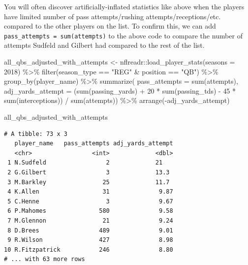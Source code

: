 \documentclass[
  letterpaper,
]{krantz}
\newenvironment{Shaded}{\begin{snugshade}}{\end{snugshade}}
\newcommand{\AttributeTok}[1]{\textcolor[rgb]{0.40,0.45,0.13}{#1}}
\newcommand{\DecValTok}[1]{\textcolor[rgb]{0.68,0.00,0.00}{#1}}
\newcommand{\FunctionTok}[1]{\textcolor[rgb]{0.28,0.35,0.67}{#1}}
\newcommand{\NormalTok}[1]{\textcolor[rgb]{0.00,0.23,0.31}{#1}}
\newcommand{\OtherTok}[1]{\textcolor[rgb]{0.00,0.23,0.31}{#1}}
\newcommand{\SpecialCharTok}[1]{\textcolor[rgb]{0.37,0.37,0.37}{#1}}
\newcommand{\StringTok}[1]{\textcolor[rgb]{0.13,0.47,0.30}{#1}}
\begin{document}
\begin{tcolorbox}[enhanced jigsaw, colback=white, leftrule=.75mm, breakable, colframe=quarto-callout-important-color-frame, bottomtitle=1mm, rightrule=.15mm, left=2mm, opacityback=0, bottomrule=.15mm, arc=.35mm, coltitle=black, colbacktitle=quarto-callout-important-color!10!white, toptitle=1mm, titlerule=0mm, title=\textcolor{quarto-callout-important-color}{\faExclamation}\hspace{0.5em}{Important}, toprule=.15mm, opacitybacktitle=0.6]

You will often discover artificially-inflated statistics like above when
the players have limited number of pass attempts/rushing
attempts/receptions/etc. compared to the other players on the list. To
confirm this, we can add \texttt{pass\_attempts\ =\ sum(attempts)} to
the above code to compare the number of attempts Sudfeld and Gilbert had
compared to the rest of the list.

\begin{Shaded}
\begin{Highlighting}[]
\NormalTok{all\_qbs\_adjusted\_with\_attempts }\OtherTok{\textless{}{-}}
\NormalTok{  nflreadr}\SpecialCharTok{::}\FunctionTok{load\_player\_stats}\NormalTok{(}\AttributeTok{seasons =} \DecValTok{2018}\NormalTok{) }\SpecialCharTok{\%\textgreater{}\%}
  \FunctionTok{filter}\NormalTok{(season\_type }\SpecialCharTok{==} \StringTok{"REG"} \SpecialCharTok{\&}\NormalTok{ position }\SpecialCharTok{==} \StringTok{"QB"}\NormalTok{) }\SpecialCharTok{\%\textgreater{}\%}
  \FunctionTok{group\_by}\NormalTok{(player\_name) }\SpecialCharTok{\%\textgreater{}\%}
  \FunctionTok{summarize}\NormalTok{(}
    \AttributeTok{pass\_attempts =} \FunctionTok{sum}\NormalTok{(attempts),}
    \AttributeTok{adj\_yards\_attempt =}\NormalTok{ (}\FunctionTok{sum}\NormalTok{(passing\_yards) }\SpecialCharTok{+} \DecValTok{20} \SpecialCharTok{*}
                           \FunctionTok{sum}\NormalTok{(passing\_tds) }\SpecialCharTok{{-}} \DecValTok{45} \SpecialCharTok{*}
                           \FunctionTok{sum}\NormalTok{(interceptions)) }\SpecialCharTok{/} \FunctionTok{sum}\NormalTok{(attempts)) }\SpecialCharTok{\%\textgreater{}\%}
  \FunctionTok{arrange}\NormalTok{(}\SpecialCharTok{{-}}\NormalTok{adj\_yards\_attempt)}

\NormalTok{all\_qbs\_adjusted\_with\_attempts}
\end{Highlighting}
\end{Shaded}

\begin{verbatim}
# A tibble: 73 x 3
   player_name   pass_attempts adj_yards_attempt
   <chr>                 <int>             <dbl>
 1 N.Sudfeld                 2             21   
 2 G.Gilbert                 3             13.3 
 3 M.Barkley                25             11.7 
 4 K.Allen                  31              9.87
 5 C.Henne                   3              9.67
 6 P.Mahomes               580              9.58
 7 M.Glennon                21              9.24
 8 D.Brees                 489              9.01
 9 R.Wilson                427              8.98
10 R.Fitzpatrick           246              8.80
# ... with 63 more rows
\end{verbatim}


\end{tcolorbox}
\end{document}
